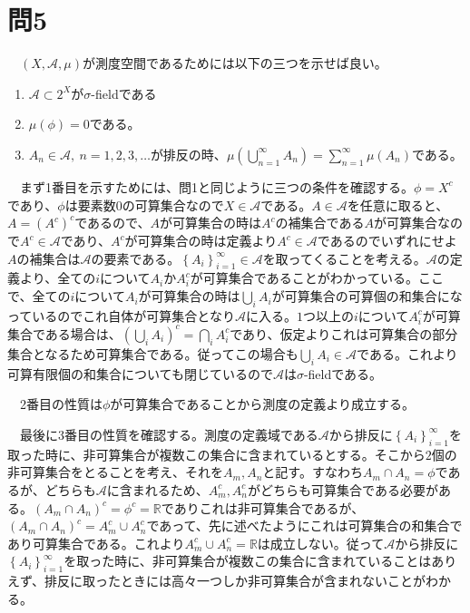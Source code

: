 \documentclass{article}
\begin{document}
\section{問5}
　$\left( X, \mathcal{A}, \mu \right)$が測度空間であるためには以下の三つを示せば良い。
\begin{enumerate}
	\item $\mathcal{A} \subset 2^X$が$\sigma$-fieldである
	\item $\mu(\phi) = 0$である。
	\item $A_n \in \mathcal{A},\ n = 1,2,3,\dots$が排反の時、$\mu\left( \bigcup_{n = 1}^{\infty} A_n \right) = \sum_{n = 1}^{\infty} \mu\left( A_n \right)$である。
\end{enumerate}

　まず1番目を示すためには、問1と同じように三つの条件を確認する。$\phi = X^c$であり、$\phi$は要素数$0$の可算集合なので$X \in \mathcal{A}$である。$A \in \mathcal{A}$を任意に取ると、$A = (A^c)^c$であるので、$A$が可算集合の時は$A^c$の補集合である$A$が可算集合なので$A^c \in \mathcal{A}$であり、$A^c$が可算集合の時は定義より$A^c \in \mathcal{A}$であるのでいずれにせよ$A$の補集合は$\mathcal{A}$の要素である。$\left\{ A_i \right\}_{i = 1}^{\infty} \in \mathcal{A}$を取ってくることを考える。$\mathcal{A}$の定義より、全ての$i$について$A_i$か$A_i^c$が可算集合であることがわかっている。ここで、全ての$i$について$A_i$が可算集合の時は$\bigcup_i A_i$が可算集合の可算個の和集合になっているのでこれ自体が可算集合となり$\mathcal{A}$に入る。$1$つ以上の$i$について$A_i^c$が可算集合である場合は、$\left( \bigcup_i A_i\right)^c = \bigcap_i A_i^c$であり、仮定よりこれは可算集合の部分集合となるため可算集合である。従ってこの場合も$ \bigcup_i A_i \in \mathcal{A}$である。これより可算有限個の和集合についても閉じているので$\mathcal{A}$は$\sigma$-fieldである。

　2番目の性質は$\phi$が可算集合であることから測度の定義より成立する。

　最後に3番目の性質を確認する。測度の定義域である$\mathcal{A}$から排反に$\left\{ A_i \right\}_{i = 1}^{\infty}$を取った時に、非可算集合が複数この集合に含まれているとする。そこから$2$個の非可算集合をとることを考え、それを$A_m, A_n$と記す。すなわち$A_m \cap A_n = \phi$であるが、どちらも$\mathcal{A}$に含まれるため、$A_m^c, A_n^c$がどちらも可算集合である必要がある。$\left( A_m \cap A_n \right)^c = \phi^c = \mathbb{R}$でありこれは非可算集合であるが、$\left( A_m \cap A_n \right)^c = A_m^c \cup A_n^c$であって、先に述べたようにこれは可算集合の和集合であり可算集合である。これより$A_m^c \cup A_n^c = \mathbb{R}$は成立しない。従って$\mathcal{A}$から排反に$\left\{ A_i \right\}_{i = 1}^{\infty}$を取った時に、非可算集合が複数この集合に含まれていることはありえず、排反に取ったときには高々一つしか非可算集合が含まれないことがわかる。
\end{document}
